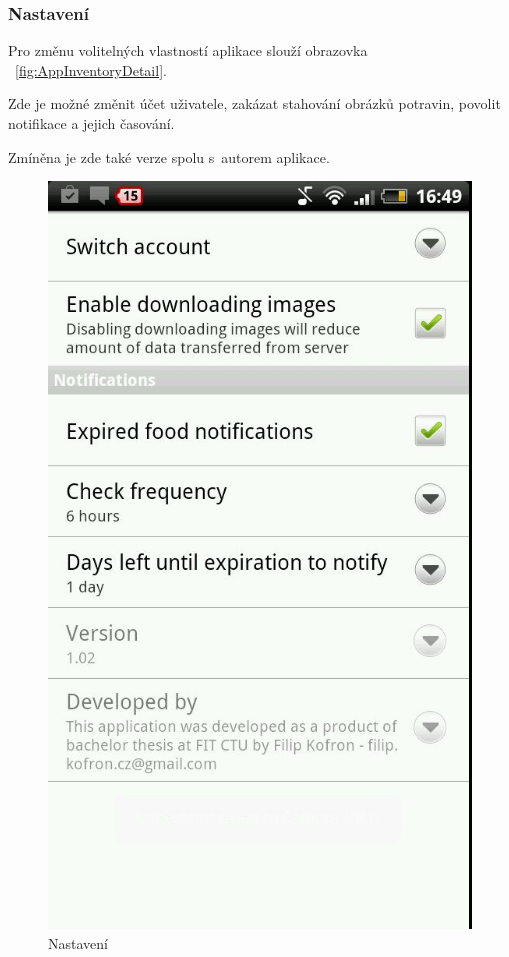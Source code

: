 \documentclass[thesis=B,czech]{FITthesis}[2013/10/20]
\begin{document}
\clearpage

\subsubsection{Nastavení}

Pro změnu volitelných vlastností aplikace slouží obrazovka ~\ref{fig:AppInventoryDetail}.

Zde je možné změnit účet uživatele, zakázat stahování obrázků potravin, povolit notifikace a jejich časování.

Zmíněna je zde také verze spolu s~autorem aplikace.

\begin{figure}[H]
  \centering
  \includegraphics[scale=0.4]{screenshots/app_settings.jpg}
  \caption{Nastavení}
  \label{fig:AppSettings}
\end{figure}
\end{document}
